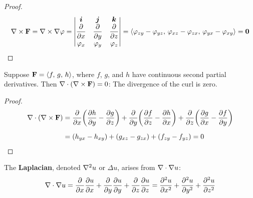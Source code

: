 \documentclass[../mathNotesPreamble]{subfiles}
\begin{document}
  \begin{proof}
    \[\nabla\times\mathbf F=\nabla\times\nabla\varphi=
      \begin{vmatrix}
        {\bm{i}}& {\bm{j}}& {\bm{k}}\\
        \dfrac{\partial}{\partial x}& \dfrac{\partial}{\partial y}& \dfrac{\partial}{\partial z}\\
        \varphi_x& \varphi_y& \varphi_z
      \end{vmatrix}
      ={\left\langle 
        \varphi_{zy}-\varphi_{yz},\,
        \varphi_{xz}-\varphi_{zx},\,
        \varphi_{yx}-\varphi_{xy} \right\rangle}
      =\mathbf{0}
    \]
  \end{proof}

  \begin{thmBox*}
    Suppose $\mathbf F={\left\langle f,\,g,\,h \right\rangle}$, where $f$, $g$, and $h$ have continuous second partial derivatives. Then $\nabla\cdot{\left(\nabla\times\mathbf F\right)}=0$: The divergence of the curl is zero.
  \end{thmBox*}
  \begin{proof}
    \begin{align*}
      \nabla\cdot{\left(\nabla\times\mathbf F\right)}&=
        \frac{\partial}{\partial x}{\left(\frac{\partial h}{\partial y}-\frac{\partial g}{\partial z}\right)}+
        \frac{\partial}{\partial y}{\left(\frac{\partial f}{\partial z}-\frac{\partial h}{\partial x}\right)}+
        \frac{\partial}{\partial z}{\left(\frac{\partial g}{\partial x}-\frac{\partial f}{\partial y}\right)}\\[5pt]
        &={\left(h_{yx}-h_{xy}\right)}+{\left(g_{xz}-g_{zx}\right)}+{\left(f_{zy}-f_{yz}\right)}=0
    \end{align*}
  \end{proof}
  \pagebreak

  The \textbf{Laplacian}, denoted $\nabla^2 u$ or $\Delta u$, arises from $\nabla\cdot\nabla u$:
    \[\nabla\cdot\nabla u=\frac{\partial }{\partial x}\frac{\partial u}{\partial x}+\frac{\partial }{\partial y}\frac{\partial u}{\partial y}+\frac{\partial }{\partial z}\frac{\partial u}{\partial z}=\frac{\partial^2 u}{\partial x^2}+\frac{\partial^2 u}{\partial y^2}+\frac{\partial^2 u}{\partial z^2}\]
\end{document}
